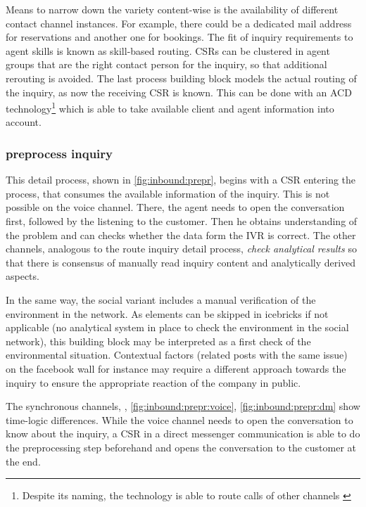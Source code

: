	 Means to narrow down the variety content-wise is the availability of different contact channel instances. For example, there could be a dedicated mail address for reservations and another one for bookings. The fit of inquiry requirements to agent skills is known as skill-based routing. \acrshort{CSR}s can be clustered in agent groups that are the right contact person for the inquiry, so that additional rerouting is avoided. The last process building block models the actual routing of the inquiry, as now the receiving  \acrshort{CSR} is known. This can be done with an \acrfull{ACD} technology\footnote{Despite its naming, the technology is able to route calls of other channels \citep{ccnet2016} } which is able to take available client and agent information into account.
	 
	 
	 \subsubsection{preprocess inquiry}
	 
	 This detail process, shown in \Fig \ref{fig:inbound:prepr}, begins with a \acrshort{CSR} entering the process, that consumes the available information of the inquiry. This is not possible on the voice channel. There, the agent needs to open the conversation first, followed by the listening to the customer. Then he obtains understanding of the problem and can checks whether the data form the \acrshort{IVR} is correct. The other channels, analogous to the route inquiry detail process, \textit{check analytical results} so that there is consensus of manually read inquiry content and analytically derived aspects.
	 
	 In the same way, the social variant includes a manual verification of the environment in the network. As elements can be skipped in icebricks if not applicable (\ie no analytical system in place to check the environment in the social network), this building block may be interpreted as a first check of the environmental situation. Contextual factors (related posts with the same issue) on the facebook wall for instance may require a different approach towards the inquiry to ensure the appropriate reaction of the company in public.   
	 
	 The synchronous channels, \ie, \Fig \ref{fig:inbound:prepr:voice}, \ref{fig:inbound:prepr:dm} show time-logic differences. While the voice channel needs to open the conversation to know about the inquiry, a \acrshort{CSR} in a direct messenger communication is able to do the preprocessing step beforehand and opens the conversation to the customer at the end. 
	 
